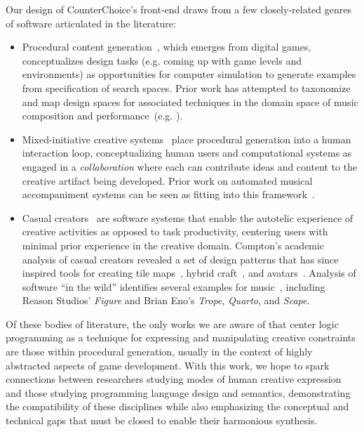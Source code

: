 Our design of CounterChoice's front-end draws from a few closely-related genres
of software articulated in the literature:
\begin{itemize}
  \item Procedural content generation~\cite{shaker2016procedural,short2017procedural}, which emerges from digital games,
    conceptualizes design tasks (e.g. coming up with game levels and
    environments) as opportunities for computer simulation to
    generate examples from specification of search spaces.
Prior work has attempted to taxonomize and map design spaces
for associated techniques in the domain space of
music composition and performance~(e.g. \cite{wooller2005framework,collins2009introduction}).
\item Mixed-initiative creative
    systems~\cite{smith2010tanagra,yannakakis2014mixed,liapis2016mixed,deterding2017mixed}
    place procedural generation
    into a human interaction loop, conceptualizing human 
users and computational systems as engaged in a {\em collaboration}
where each can contribute ideas and content to the creative
artifact being developed. Prior work on automated musical accompaniment
    systems can be seen as fitting into this
    framework~\cite{grubb1994automated}. 
\item Casual creators~\cite{compton-casual} 
are software systems that enable the autotelic experience of creative
    activities as opposed to
task productivity, centering users with minimal prior experience in the creative domain.
Compton's academic analysis of casual creators revealed a set of design patterns
    that has since inspired tools for creating
tile maps~\cite{carpenter-tile}, hybrid craft~\cite{graves-eloominate},
    and avatars~\cite{otto-avatar}.
  Analysis of software ``in the wild'' identifies several examples
    for music~\cite{petrovskaya2020casual}, including Reason Studios'
    \textit{Figure} and Brian Eno's \textit{Trope}, \textit{Quarto},
    and \textit{Scape}.
\end{itemize}

Of these bodies of literature, the only works we are aware of
that center logic programming as a technique for expressing and
manipulating creative constraints are those within procedural generation,
usually in the context of highly abstracted aspects of game development.
With this work, we hope to spark connections between researchers studying
modes of human creative expression and those studying programming language
design and semantics, demonstrating the compatibility of these disciplines
while also emphasizing the conceptual and technical gaps that must be
closed to enable their harmonious synthesis.

